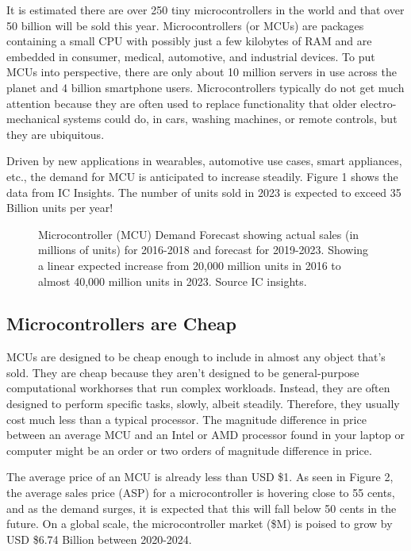 It is estimated there are over 250 tiny microcontrollers in the world and that over 50 billion will be sold this year. Microcontrollers (or MCUs) are packages containing a small CPU with possibly just a few kilobytes of RAM and are embedded in consumer, medical, automotive, and industrial devices. To put MCUs into perspective, there are only about 10 million servers in use across the planet and 4 billion smartphone users. Microcontrollers typically do not get much attention because they are often used to replace functionality that older electro-mechanical systems could do, in cars, washing machines, or remote controls, but they are ubiquitous.

Driven by new applications in wearables, automotive use cases, smart appliances, etc., the demand for MCU is anticipated to increase steadily. Figure 1 shows the data from IC Insights. The number of units sold in 2023 is expected to exceed 35 Billion units per year!


\begin{figure}
    \caption{Microcontroller (MCU) Demand Forecast showing actual sales (in millions of units) for 2016-2018 and forecast for 2019-2023. Showing a linear expected increase from 20,000 million units in 2016 to almost 40,000 million units in 2023. Source IC insights.}
\end{figure}  


\subsection{Microcontrollers are Cheap}

MCUs are designed to be cheap enough to include in almost any object that’s sold. They are cheap because they aren’t designed to be general-purpose computational workhorses that run complex workloads. Instead, they are often designed to perform specific tasks, slowly, albeit steadily. Therefore, they usually cost much less than a typical processor. The magnitude difference in price between an average MCU and an Intel or AMD processor found in your laptop or computer might be an order or two orders of magnitude difference in price. 

The average price of an MCU is already less than USD \$1. As seen in Figure 2, the average sales price (ASP) for a microcontroller is hovering close to 55 cents, and as the demand surges, it is expected that this will fall below 50 cents in the future. On a global scale, the microcontroller market (\$M) is poised to grow by USD \$6.74 Billion between 2020-2024.

